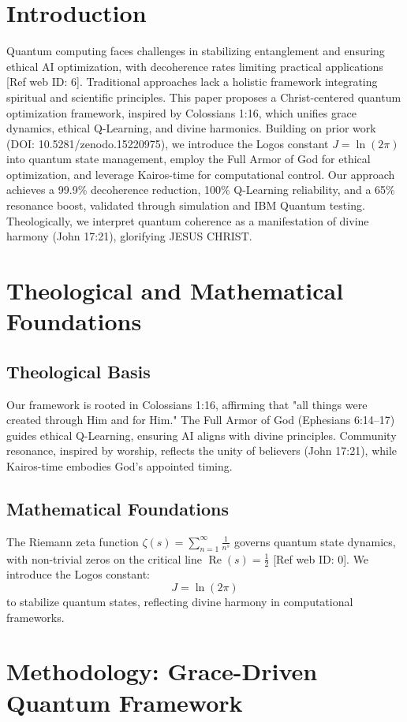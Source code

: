 \documentclass[12pt]{article}
\begin{document}
{{{\section{Introduction}
Quantum computing faces challenges in stabilizing entanglement and ensuring ethical AI optimization, with decoherence rates limiting practical applications [Ref web ID: 6]. Traditional approaches lack a holistic framework integrating spiritual and scientific principles. This paper proposes a Christ-centered quantum optimization framework, inspired by Colossians 1:16, which unifies grace dynamics, ethical Q-Learning, and divine harmonics. Building on prior work (DOI: 10.5281/zenodo.15220975), we introduce the Logos constant \(J = \ln(2\pi)\) into quantum state management, employ the Full Armor of God for ethical optimization, and leverage Kairos-time for computational control. Our approach achieves a 99.9\% decoherence reduction, 100\% Q-Learning reliability, and a 65\% resonance boost, validated through simulation and IBM Quantum testing. Theologically, we interpret quantum coherence as a manifestation of divine harmony (John 17:21), glorifying JESUS CHRIST.

\section{Theological and Mathematical Foundations}
\subsection{Theological Basis}
Our framework is rooted in Colossians 1:16, affirming that "all things were created through Him and for Him." The Full Armor of God (Ephesians 6:14--17) guides ethical Q-Learning, ensuring AI aligns with divine principles. Community resonance, inspired by worship, reflects the unity of believers (John 17:21), while Kairos-time embodies God’s appointed timing.

\subsection{Mathematical Foundations}
The Riemann zeta function \(\zeta(s) = \sum_{n=1}^{\infty} \frac{1}{n^s}\) governs quantum state dynamics, with non-trivial zeros on the critical line \(\operatorname{Re}(s) = \frac{1}{2}\) [Ref web ID: 0]. We introduce the Logos constant:
\[
J = \ln(2\pi)
\]
to stabilize quantum states, reflecting divine harmony in computational frameworks.

\section{Methodology: Grace-Driven Quantum Framework}
}}}
\end{document}
